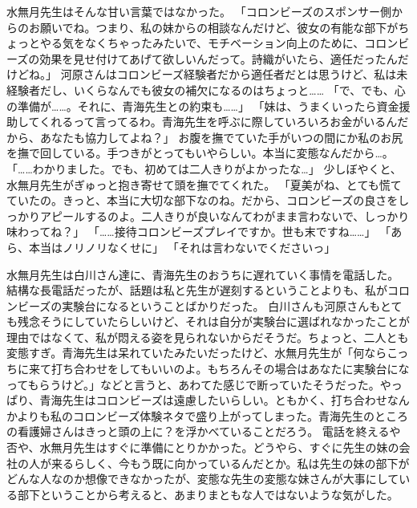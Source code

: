 水無月先生はそんな甘い言葉ではなかった。
「コロンビーズのスポンサー側からのお願いでね。つまり、私の妹からの相談なんだけど、彼女の有能な部下がちょっとやる気をなくちゃったみたいで、モチベーション向上のために、コロンビーズの効果を見せ付けてあげて欲しいんだって。詩織がいたら、適任だったんだけどね。」
河原さんはコロンビーズ経験者だから適任者だとは思うけど、私は未経験者だし、いくらなんでも彼女の補欠になるのはちょっと……
「で、でも、心の準備が……。それに、青海先生との約束も……」
「妹は、うまくいったら資金援助してくれるって言ってるわ。青海先生を呼ぶに際していろいろお金がいるんだから、あなたも協力してよね？」
お腹を撫でていた手がいつの間にか私のお尻を撫で回している。手つきがとってもいやらしい。本当に変態なんだから…。
「……わかりました。でも、初めては二人きりがよかったな…」
少しぼやくと、水無月先生がぎゅっと抱き寄せて頭を撫でてくれた。
「夏美がね、とても慌てていたの。きっと、本当に大切な部下なのね。だから、コロンビーズの良さをしっかりアピールするのよ。二人きりが良いなんてわがまま言わないで、しっかり味わってね？」
「……接待コロンビーズプレイですか。世も末ですね……」
「あら、本当はノリノリなくせに」
「それは言わないでくださいっ」

水無月先生は白川さん達に、青海先生のおうちに遅れていく事情を電話した。
結構な長電話だったが、話題は私と先生が遅刻するということよりも、私がコロンビーズの実験台になるということばかりだった。
白川さんも河原さんもとても残念そうにしていたらしいけど、それは自分が実験台に選ばれなかったことが理由ではなくて、私が悶える姿を見られないからだそうだ。ちょっと、二人とも変態すぎ。青海先生は呆れていたみたいだったけど、水無月先生が「何ならこっちに来て打ち合わせをしてもいいのよ。もちろんその場合はあなたに実験台になってもらうけど。」などと言うと、あわてた感じで断っていたそうだった。やっぱり、青海先生はコロンビーズは遠慮したいらしい。ともかく、打ち合わせなんかよりも私のコロンビーズ体験ネタで盛り上がってしまった。青海先生のところの看護婦さんはきっと頭の上に？を浮かべていることだろう。
電話を終えるや否や、水無月先生はすぐに準備にとりかかった。どうやら、すぐに先生の妹の会社の人が来るらしく、今もう既に向かっているんだとか。私は先生の妹の部下がどんな人なのか想像できなかったが、変態な先生の変態な妹さんが大事にしている部下ということから考えると、あまりまともな人ではないような気がした。

